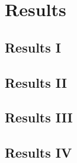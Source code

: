 \section{Results} \label{sec: numerical_results}

\subsection{Results I}

    \lipsum[2]

\subsection{Results II}

    \lipsum[2]

\subsection{Results III}

    \lipsum[2]
    
\subsection{Results IV}

    \lipsum[2]
    
    
    
    